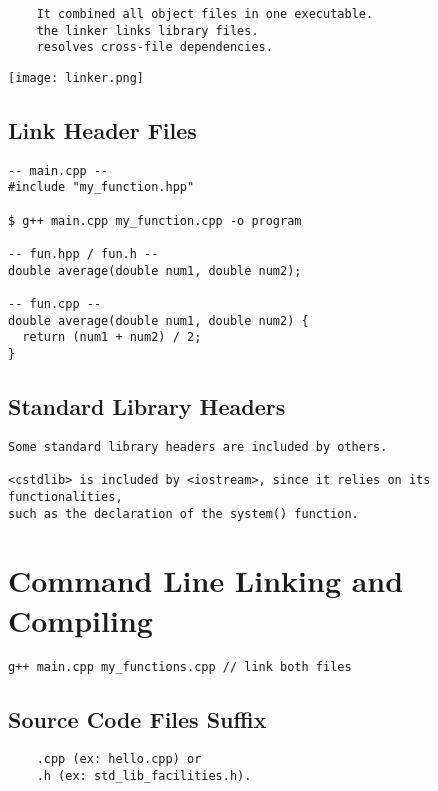 \begin{verbatim}
    It combined all object files in one executable.
    the linker links library files. 
    resolves cross-file dependencies.  
\end{verbatim}

\begin{center}
\texttt{[image: linker.png]}
\end{center}

\subsection{Link Header Files}

\begin{verbatim}
-- main.cpp --
#include "my_function.hpp"

$ g++ main.cpp my_function.cpp -o program

-- fun.hpp / fun.h --
double average(double num1, double num2);

-- fun.cpp --
double average(double num1, double num2) {
  return (num1 + num2) / 2;
}
\end{verbatim}

\subsection{Standard Library Headers}

\begin{verbatim}
Some standard library headers are included by others. 

<cstdlib> is included by <iostream>, since it relies on its functionalities,
such as the declaration of the system() function. 
\end{verbatim}

\section{Command Line Linking and Compiling}

\begin{verbatim}
g++ main.cpp my_functions.cpp // link both files
\end{verbatim}

\subsection{Source Code Files Suffix}

\begin{verbatim}
    .cpp (ex: hello.cpp) or
    .h (ex: std_lib_facilities.h).
\end{verbatim}


